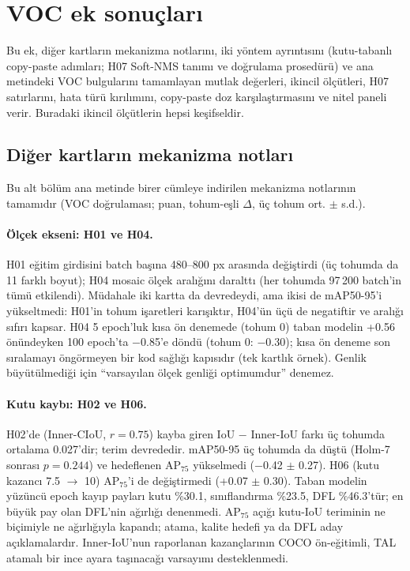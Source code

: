 \setcounter{table}{0}\setcounter{figure}{0}
\section{VOC ek sonuçları}\label{sec:ek-voc}

Bu ek, diğer kartların mekanizma notlarını, iki yöntem ayrıntısını (kutu-tabanlı copy-paste adımları; H07 Soft-NMS tanımı ve doğrulama prosedürü) ve ana metindeki VOC bulgularını tamamlayan mutlak değerleri, ikincil ölçütleri, H07 satırlarını, hata türü kırılımını, copy-paste doz karşılaştırmasını ve nitel paneli verir. Buradaki ikincil ölçütlerin hepsi keşifseldir.

\subsection{Diğer kartların mekanizma notları}\label{sec:ek-mekanizma}
Bu alt bölüm ana metinde birer cümleye indirilen mekanizma notlarının tamamıdır (VOC doğrulaması; puan, tohum-eşli $\Delta$, üç tohum ort. $\pm$ s.d.).

\paragraph{Ölçek ekseni: H01 ve H04.}
H01 eğitim girdisini batch başına 480--800 px arasında değiştirdi (üç tohumda da 11 farklı boyut); H04 mosaic ölçek aralığını daralttı (her tohumda 97\,200 batch'in tümü etkilendi). Müdahale iki kartta da devredeydi, ama ikisi de mAP50-95'i yükseltmedi: H01'in tohum işaretleri karışıktır, H04'ün üçü de negatiftir ve aralığı sıfırı kapsar. H04 5 epoch'luk kısa ön denemede (tohum 0) taban modelin +0.56 önündeyken 100 epoch'ta $-$0.85'e döndü (tohum 0: $-$0.30); kısa ön deneme son sıralamayı öngörmeyen bir kod sağlığı kapısıdır (tek kartlık örnek). Genlik büyütülmediği için ``varsayılan ölçek genliği optimumdur'' denemez.

\paragraph{Kutu kaybı: H02 ve H06.}
H02'de (Inner-CIoU, $r=0.75$) kayba giren IoU $-$ Inner-IoU farkı üç tohumda ortalama 0.027'dir; terim devrededir. mAP50-95 üç tohumda da düştü (Holm-7 sonrası $p=0.244$) ve hedeflenen AP$_{75}$ yükselmedi ($-$0.42 $\pm$ 0.27). H06 (kutu kazancı 7.5 $\to$ 10) AP$_{75}$'i de değiştirmedi (+0.07 $\pm$ 0.30). Taban modelin yüzüncü epoch kayıp payları kutu \%30.1, sınıflandırma \%23.5, DFL \%46.3'tür; en büyük pay olan DFL'nin ağırlığı denenmedi. AP$_{75}$ açığı kutu-IoU teriminin ne biçimiyle ne ağırlığıyla kapandı; atama, kalite hedefi ya da DFL aday açıklamalardır. Inner-IoU'nun raporlanan kazançlarının \cite{zhang_2023_inneriou} COCO ön-eğitimli, TAL atamalı bir ince ayara taşınacağı varsayımı desteklenmedi.


